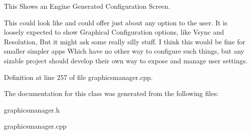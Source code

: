 This Shows an Engine Generated Configuration Screen. 

This could look like and could offer just about any option to the user. It is loosely expected to show Graphical Configuration options, like Vsync and Resolution, But it might ask some really silly stuff. I think this would be fine for smaller simpler apps Which have no other way to configure such things, but any sizable project should develop their own way to expose and manage user settings. 

Definition at line 257 of file graphicsmanager.cpp.



The documentation for this class was generated from the following files:\begin{DoxyCompactItemize}
\item 
graphicsmanager.h\item 
graphicsmanager.cpp\end{DoxyCompactItemize}

